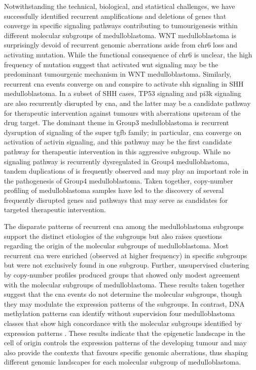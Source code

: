Notwithstanding the technical, biological, and statistical challenges, we have successfully identified recurrent amplifications and deletions of genes that converge in specific signaling pathways contributing to tumourigenesis within different molecular subgroups of medulloblastoma. WNT medulloblastoma is surprisingly devoid of recurrent genomic aberrations aside from chr6 loss and  activating mutation. While the functional consequence of chr6 is unclear, the high frequency of  mutation suggest that activated \gls{wnt} signaling may be the predominant tumourgenic mechanism in WNT medulloblastoma. Similarly, recurrent \gls{cna} events converge on and conspire to activate \gls{shh} signaling in SHH medulloblastoma. In a subset of SHH cases, TP53 signaling and \gls{pi3k} signaling are also recurrently disrupted by \gls{cna}, and the latter may be a candidate pathway for therapeutic intervention against tumours with aberrations upstream of the drug target. The dominant theme in Group3 medulloblastoma is recurrent dysruption of signaling of the super \gls{tgfb} family; in particular, \gls{cna} converge on activation of activin signaling, and this pathway may be the first candidate pathway for therapeutic intervention in this aggressive subgroup. While no signaling pathway is recurrently dysregulated in Group4 medulloblastoma, tandem duplications of  is frequently observed and may play an important role in the pathogenesis of Group4 medulloblastoma. Taken together, copy-number profiling of medulloblastoma samples have led to the discovery of several frequently disrupted genes and pathways that may serve as candidates for targeted therapeutic intervention.

The disparate patterns of recurrent \gls{cna} among the medulloblastoma subgroups support the distinct etiologies of the subgroups but also raises questions regarding the origin of the molecular subgroups of medulloblastoma. Most recurrent \gls{cna} were enriched (observed at higher frequency) in specific subgroups but were not exclusively found in one subgroup. Further, unsupervised clustering by copy-number profiles produced groups that showed only modest agreement with the molecular subgroups of medulloblastoma. These results taken together suggest that the \gls{cna} events do not determine the molecular subgroups, though they may modulate the expression patterns of the subgroups. In contrast, DNA methylation patterns can identify without supervision four medulloblastoma classes that show high concordance with the molecular subgroups identified by expression patterns . These results indicate that the epigenetic landscape in the cell of origin controls the expression patterns of the developing tumour and may also provide the contexts that favours specific genomic aberrations, thus shaping different genomic landscapes for each molecular subgroup of medulloblastoma.

